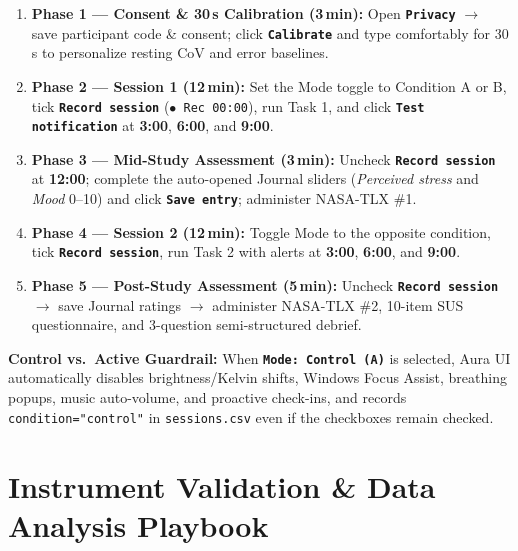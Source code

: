 \documentclass[11pt,a4paper]{article}
\newcommand{\uictrl}[1]{\texttt{\textbf{#1}}}
\newcommand{\notebox}[2]{%
  \vspace{0.2cm}\noindent
  \colorbox{CalloutBg}{%
    \parbox{\dimexpr\textwidth-2\fboxsep\relax}{%
      \small \textbf{\color{AuraTeal}#1:} #2%
    }%
  }\vspace{0.25cm}%
}
\begin{document}
\begin{enumerate}[leftmargin=1.5em, itemsep=2pt]
    \item \textbf{Phase 1 --- Consent \& 30\,s Calibration (3\,min):} Open \uictrl{Privacy} $\rightarrow$ save participant code \& consent; click \uictrl{Calibrate} and type comfortably for 30\,s to personalize resting CoV and error baselines.
    \item \textbf{Phase 2 --- Session 1 (12\,min):} Set the Mode toggle to Condition A or B, tick \uictrl{Record session} (\texttt{$\bullet$ Rec 00:00}), run Task 1, and click \uictrl{Test notification} at \textbf{3:00}, \textbf{6:00}, and \textbf{9:00}.
    \item \textbf{Phase 3 --- Mid-Study Assessment (3\,min):} Uncheck \uictrl{Record session} at \textbf{12:00}; complete the auto-opened Journal sliders (\textit{Perceived stress} and \textit{Mood} 0--10) and click \uictrl{Save entry}; administer NASA-TLX \#1.
    \item \textbf{Phase 4 --- Session 2 (12\,min):} Toggle Mode to the opposite condition, tick \uictrl{Record session}, run Task 2 with alerts at \textbf{3:00}, \textbf{6:00}, and \textbf{9:00}.
    \item \textbf{Phase 5 --- Post-Study Assessment (5\,min):} Uncheck \uictrl{Record session} $\rightarrow$ save Journal ratings $\rightarrow$ administer NASA-TLX \#2, 10-item SUS questionnaire, and 3-question semi-structured debrief.
\end{enumerate}

\notebox{Control vs.\ Active Guardrail}{When \uictrl{Mode: Control (A)} is selected, Aura UI automatically disables brightness/Kelvin shifts, Windows Focus Assist, breathing popups, music auto-volume, and proactive check-ins, and records \texttt{condition="control"} in \texttt{sessions.csv} even if the checkboxes remain checked.}

\section{Instrument Validation \& Data Analysis Playbook}
\end{document}
